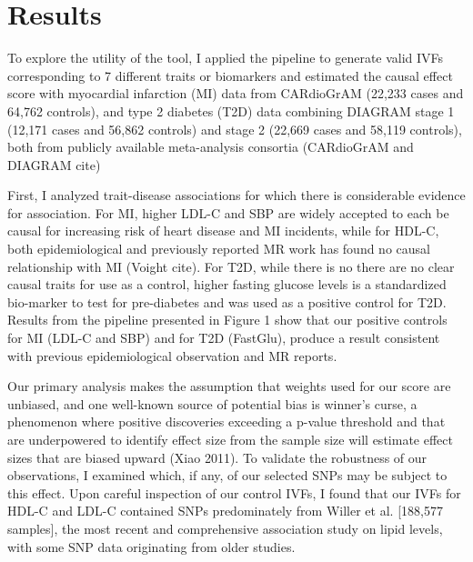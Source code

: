 \section{Results}
To explore the utility of the tool, I applied the pipeline to generate valid IVFs corresponding to 7 different
traits or biomarkers and estimated the causal effect score with myocardial infarction (MI) data 
from CARdioGrAM (22,233 cases and 64,762 controls), and type 2 diabetes (T2D) data combining DIAGRAM stage 1 (12,171 
cases and 56,862 controls) and stage 2 (22,669 cases and 58,119 controls), both from publicly available meta-analysis consortia (CARdioGrAM and DIAGRAM cite)

First, I analyzed trait-disease associations for which there is considerable evidence for association. For MI, higher LDL-C and SBP are widely accepted to each be causal for increasing risk of heart disease and MI incidents, while for HDL-C, both epidemiological and previously reported MR work has found no causal relationship with MI (Voight cite). For T2D, while there is no there are no clear causal traits for use as a control, higher fasting glucose levels is a standardized bio-marker to test for pre-diabetes and was used as a positive control for T2D. Results from the pipeline presented in Figure 1 show that our positive controls for MI (LDL-C and 
SBP) and for T2D (FastGlu), produce a result consistent with previous epidemiological observation and MR reports. 

Our primary analysis makes the assumption that weights used for our score are unbiased, and one well-known source of potential bias is winner's curse, a phenomenon where positive discoveries exceeding a p-value threshold and that are underpowered to identify effect size from the sample size will estimate effect sizes that are biased upward (Xiao 2011). To validate the robustness of our observations, I examined which, if any, of our selected SNPs may be subject to this effect. Upon careful inspection of our control IVFs, I found that our IVFs for HDL-C and LDL-C contained SNPs predominately from Willer et al. [188,577 samples], the most recent and comprehensive association study on lipid levels, with some SNP data originating from older studies. 

